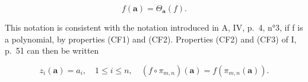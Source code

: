 \[
f (\boldsymbol {a}) = \Theta_ {\boldsymbol {a}} (f).\tag{6}
\]

This notation is consistent with the notation introduced in A, IV, p.~4, n°3, if f is a polynomial, by properties (CF1) and (CF2). Properties (CF2) and (CF3) of I, p.~51 can then be written

\[
z _ {i} (\boldsymbol {a}) = a _ {i}, \quad 1 \leqslant i \leqslant n, \quad (f \circ \pi_ {m, n}) (\boldsymbol {a}) = f (\pi_ {m, n} (\boldsymbol {a})).
\]

